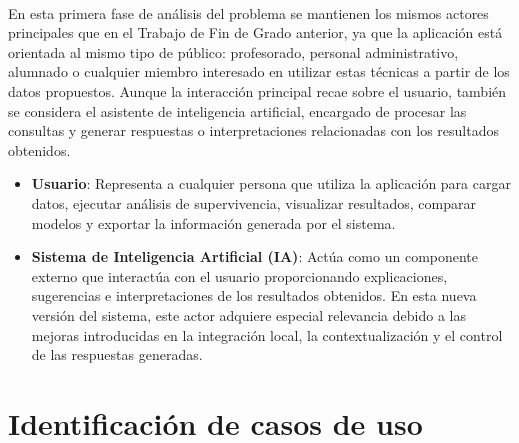 \paragraph*{}En esta primera fase de análisis del problema se mantienen los mismos actores principales que en el Trabajo de Fin de Grado anterior, ya que la aplicación está orientada al mismo tipo de público: profesorado, personal administrativo, alumnado o cualquier miembro interesado en utilizar estas técnicas a partir de los datos propuestos. Aunque la interacción principal recae sobre el usuario, también se considera el asistente de inteligencia artificial, encargado de procesar las consultas y generar respuestas o interpretaciones relacionadas con los resultados obtenidos.
\begin{itemize}
    \item \textbf{Usuario}: Representa a cualquier persona que utiliza la aplicación para cargar datos, ejecutar análisis de supervivencia, visualizar resultados, comparar modelos y exportar la información generada por el sistema.
    \item \textbf{Sistema de Inteligencia Artificial (IA)}: Actúa como un componente externo que interactúa con el usuario proporcionando explicaciones, sugerencias e interpretaciones de los resultados obtenidos. En esta nueva versión del sistema, este actor adquiere especial relevancia debido a las mejoras introducidas en la integración local, la contextualización y el control de las respuestas generadas.
\end{itemize}





\section{Identificación de casos de uso}
